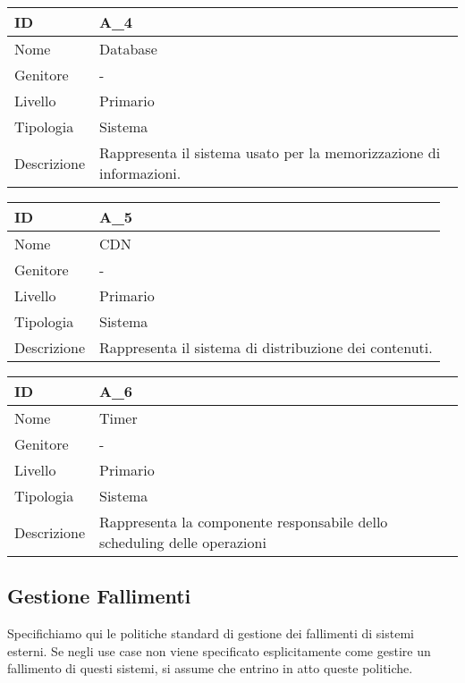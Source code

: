 \begin{center}
\begin{tabular}{ |p{2cm}|p{10cm}|  }
\hline
ID & A\_4 \\\hline
Nome & Database\\\hline
Genitore & - \\\hline
Livello &  Primario \\\hline
Tipologia & Sistema \\\hline
Descrizione &  Rappresenta il sistema usato per la memorizzazione di informazioni. \\\hline
\end{tabular}
\label{table_attore:4}\newline

\begin{tabular}{ |p{2cm}|p{10cm}|  }
\hline
ID & A\_5 \\\hline
Nome & CDN\\\hline
Genitore & - \\\hline
Livello &  Primario \\\hline
Tipologia & Sistema \\\hline
Descrizione &  Rappresenta il sistema di distribuzione dei contenuti. \\\hline
\end{tabular}
\label{table_attore:5}\newline

\begin{tabular}{ |p{2cm}|p{10cm}|  }
\hline
ID & A\_6 \\\hline
Nome & Timer\\\hline
Genitore & - \\\hline
Livello &  Primario \\\hline
Tipologia & Sistema \\\hline
Descrizione &  Rappresenta la componente responsabile dello scheduling delle operazioni \\\hline
\end{tabular}
\label{table_attore:6}\newline


\end{center}

\subsection{Gestione Fallimenti}
Specifichiamo qui le politiche standard di gestione dei fallimenti di sistemi esterni. Se negli use case non viene specificato esplicitamente come gestire un fallimento di questi sistemi, si assume che entrino in atto queste politiche.

